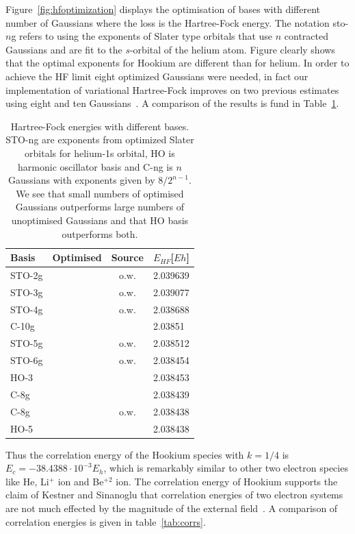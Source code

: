 \documentclass[final,3p,times,twocolumn]{elsarticle}
\newcommand{\cmark}{\ding{51}}%
\newcommand{\xmark}{\ding{55}}%
\begin{document}
	Figure~\ref{fig:hfoptimization} displays the optimisation of bases with different number of Gaussians where the loss is the Hartree-Fock energy. The notation sto-$n$g refers to using the exponents of Slater type orbitals that use $n$ contracted Gaussians and are fit to the $s$-orbital of the helium atom. Figure clearly shows that the optimal exponents for Hookium are different than for helium. In order to achieve the HF limit eight optimized Gaussians were needed, in fact our implementation of variational Hartree-Fock improves on two previous estimates using eight and ten Gaussians~\cite{ONeill2003wave, amovilli2003exact}. A comparison of the results is fund in Table~\ref{tab:HFenergies}.
	\begin{table}[h]
		\centering
		\begin{tabular}{@{}lccl@{}} 
			\toprule
			Basis & Optimised & Source & $E_{HF}$[$Eh$]\\ \midrule
			STO-2g & \cmark & o.w. & 2.039639 \\
			STO-3g & \cmark & o.w. & 2.039077 \\
			STO-4g & \cmark & o.w. & 2.038688 \\
			C-10g & \xmark & \cite{amovilli2003exact} & 2.03851 \\
			STO-5g & \cmark & o.w. & 2.038512 \\
			STO-6g & \cmark & o.w. & 2.038454 \\
			HO-3 & \xmark & \cite{ONeill2003wave} & 2.038453 \\ 
			C-8g & \xmark & \cite{ONeill2003wave} & 2.038439 \\
			C-8g & \cmark & o.w. & 2.038438 \\
			HO-5 & \xmark & \cite{ONeill2003wave} & 2.038438 \\ 
			\bottomrule
		\end{tabular}
		\caption{\label{tab:HFenergies}Hartree-Fock energies with different bases. STO-ng are exponents from optimized Slater orbitals for helium-1s orbital, HO is harmonic oscillator basis and C-ng is $n$ Gaussians with exponents given by $8 / 2^{n-1}$. We see that small numbers of optimised Gaussians outperforms large numbers of unoptimised Gaussians and that HO basis outperforms both.}
	\end{table}
	Thus the correlation energy of the Hookium species with $k=1/4$ is $E_c = -38.4388\cdot 10^{-3} E_h$, which is remarkably similar to other two electron species like He, Li$^+$ ion and Be$^{+2}$ ion. The correlation energy of Hookium supports the claim of Kestner and Sinanoglu that correlation energies of two electron systems are not much effected by the magnitude of the external field~\cite{ONeill2003wave}. A comparison of correlation energies is given in table~\ref{tab:corrs}.
\end{document}
